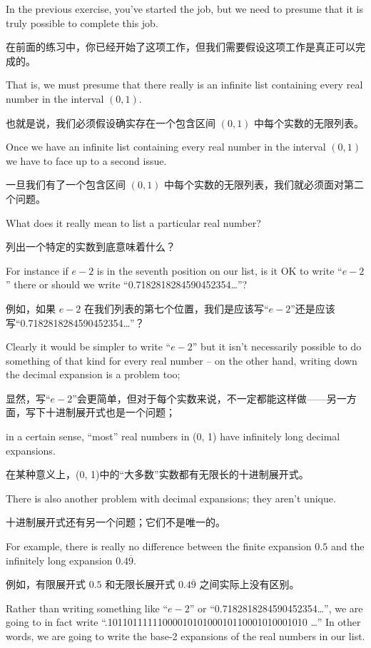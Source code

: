 In the previous exercise, you've started the job, but we need to presume
that it is truly possible to complete this job.

在前面的练习中，你已经开始了这项工作，但我们需要假设这项工作是真正可以完成的。

That is, we must presume
that there really is an infinite list containing every real number in
the interval $(0, 1)$.

也就是说，我们必须假设确实存在一个包含区间 $(0, 1)$ 中每个实数的无限列表。

Once we have an infinite list containing every real number in the interval
$(0, 1)$ we have to face up to a second issue.

一旦我们有了一个包含区间 $(0, 1)$ 中每个实数的无限列表，我们就必须面对第二个问题。

What does it really mean
to list a particular real number?

列出一个特定的实数到底意味着什么？

For instance if $e-2$ is in the seventh
position on our list, is it OK to write ``$e-2$'' there or should we write
``0.7182818284590452354\ldots''?

例如，如果 $e-2$ 在我们列表的第七个位置，我们是应该写“$e-2$”还是应该写“0.7182818284590452354\ldots”？

Clearly it would be simpler to write
``$e-2$'' but it isn't necessarily possible to do something of that kind
for every real
number -- on the other hand, writing down the decimal expansion is a problem
too;

显然，写“$e-2$”会更简单，但对于每个实数来说，不一定都能这样做——另一方面，写下十进制展开式也是一个问题；

in a certain sense, ``most'' real numbers in (0, 1) have infinitely long
decimal expansions.

在某种意义上，(0, 1)中的“大多数”实数都有无限长的十进制展开式。

There is also another problem with decimal expansions;
they aren't unique.

十进制展开式还有另一个问题；它们不是唯一的。

For example, there is really no difference between the
finite expansion $0.5$ and the infinitely long expansion  $0.4\overline{9}$.

例如，有限展开式 $0.5$ 和无限长展开式 $0.4\overline{9}$ 之间实际上没有区别。

Rather than writing something like ``$e-2$'' or ``0.7182818284590452354\ldots'',
we are going to in fact write ``.1011011111100001010100010110001010001010 \ldots''
In other words, we are going to write the base-2 expansions of the real numbers
in our list.

